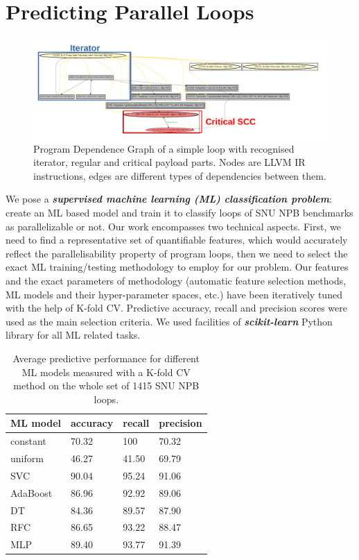 \documentclass{acaces}
\begin{document}
\section{Predicting Parallel Loops}
\label{predicting_parallel_loops}
\begin{figure}
	\centering
	\includegraphics[width=1.0\textwidth]{pdg_example}
	\caption{Program Dependence Graph of a simple loop with recognised iterator, regular and critical payload parts. Nodes are LLVM IR instructions, edges are different types of dependencies between them.}
	\label{fig:pdg}
\end{figure}
\quad We pose a \textit{\textbf{supervised machine learning (ML) classification problem}}: create an ML based model and train it to classify loops of SNU NPB benchmarks as parallelizable or not. Our work encompasses two technical aspects. First, we need to find a representative set of quantifiable features, which would accurately reflect the parallelisability property of program loops, then we need to select the exact ML training/testing methodology to employ for our problem. Our features and the exact parameters of methodology (automatic feature selection methods, ML models and their hyper-parameter spaces, etc.) have been iteratively tuned with the help of K-fold CV. Predictive accuracy, recall and precision scores were used as the main selection criteria. We used facilities of \textbf{\textit{scikit-learn}} Python library for all ML related tasks.
\begin{table}
	\centering
	\begin{tabular}[c]{|p{1.5cm}|p{1.5cm}|p{1.5cm}|p{1.5cm}|}
		\hline
		ML model & accuracy & recall & precision \\
		\hline
		constant & 70.32 & 100 & 70.32\\
		\hline
		uniform & 46.27 & 41.50 & 69.79\\
		\hline
		SVC & 90.04 & 95.24 & 91.06 \\
		\hline
		AdaBoost & 86.96 & 92.92 & 89.06 \\
		\hline
		DT & 84.36 & 89.57 & 87.90 \\
		\hline
		RFC & 86.65 & 93.22 & 88.47 \\
		\hline
		MLP & 89.40 & 93.77 & 91.39 \\
		\hline
	\end{tabular}
	\caption{Average predictive performance for different ML models measured with a K-fold CV method on the whole set of 1415 SNU NPB loops.}
	\label{tab:accuracy}
\end{table}
\end{document}
